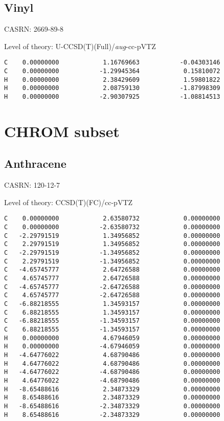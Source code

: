\documentclass[journal=jctcce,manuscript=article,layout=traditional]{achemso}
\newcommand{\TZ}{cc-pVTZ}
\newcommand{\AVTZ}{\emph{aug}-cc-pVTZ}
\begin{document}
\subsection{Vinyl}

CASRN: 2669-89-8

\begin{singlespace}
\noindent Level of theory: U-CCSD(T)(Full)/{\AVTZ}
\begin{verbatim}
C    0.00000000            1.16769663           -0.04303146
C    0.00000000           -1.29945364            0.15810072
H    0.00000000            2.38429609            1.59801822
H    0.00000000            2.08759130           -1.87998309
H    0.00000000           -2.90307925           -1.08814513
\end{verbatim}
\end{singlespace}

\clearpage

\section{CHROM subset}

\subsection{Anthracene}

CASRN: 120-12-7

\begin{singlespace}
\noindent Level of theory: CCSD(T)(FC)/{\TZ}
\begin{verbatim}
C    0.00000000            2.63580732            0.00000000
C    0.00000000           -2.63580732            0.00000000
C   -2.29791519            1.34956852            0.00000000
C    2.29791519            1.34956852            0.00000000
C   -2.29791519           -1.34956852            0.00000000
C    2.29791519           -1.34956852            0.00000000
C   -4.65745777            2.64726588            0.00000000
C    4.65745777            2.64726588            0.00000000
C   -4.65745777           -2.64726588            0.00000000
C    4.65745777           -2.64726588            0.00000000
C   -6.88218555            1.34593157            0.00000000
C    6.88218555            1.34593157            0.00000000
C   -6.88218555           -1.34593157            0.00000000
C    6.88218555           -1.34593157            0.00000000
H    0.00000000            4.67946059            0.00000000
H    0.00000000           -4.67946059            0.00000000
H   -4.64776022            4.68790486            0.00000000
H    4.64776022            4.68790486            0.00000000
H   -4.64776022           -4.68790486            0.00000000
H    4.64776022           -4.68790486            0.00000000
H   -8.65488616            2.34873329            0.00000000
H    8.65488616            2.34873329            0.00000000
H   -8.65488616           -2.34873329            0.00000000
H    8.65488616           -2.34873329            0.00000000
\end{verbatim}
\end{singlespace}
\end{document}

